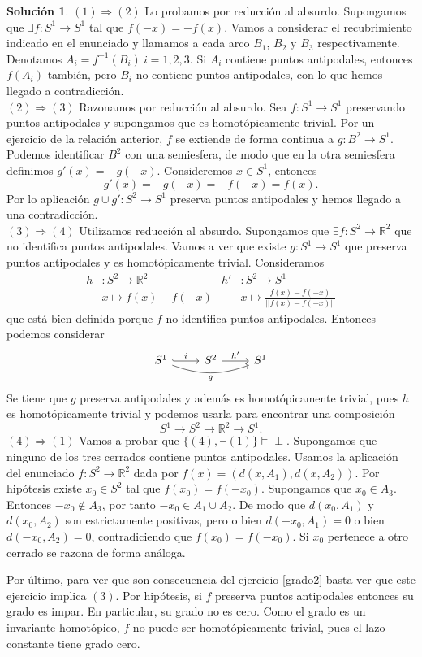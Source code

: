 \documentclass{article}
\theoremstyle{plain}
\theoremstyle{definition}
\newtheorem*{sol*}{Solución}
\newcommand{\R}{\mathbb{R}}
\begin{document}
\begin{sol*}
$\boxed{(1) \Rightarrow (2)}$ Lo probamos por reducción al absurdo. Supongamos que $\exists f:S^1\to S^1$ tal que $f(-x)=-f(x)$. Vamos a considerar el recubrimiento indicado en el enunciado y llamamos a cada arco $B_1$, $B_2$ y $B_3$ respectivamente. Denotamos $A_i=f^{-1}(B_i)\ i=1,2,3$. Si $A_i$ contiene puntos antipodales, entonces $f(A_i)$ también, pero $B_i$ no contiene puntos antipodales, con lo que hemos llegado a contradicción.\\
$\boxed{(2) \Rightarrow (3)}$ Razonamos por reducción al absurdo. Sea $f: S^1\to S^1$ preservando puntos antipodales y supongamos que es homotópicamente trivial. Por un ejercicio de la relación anterior, $f$ se extiende de forma continua a $g:B^2 \to S^1$. Podemos identificar $B^2$ con una semiesfera, de modo que en la otra semiesfera definimos $g'(x)=-g(-x)$. Consideremos $x\in S^1$, entonces
\[ g'(x)=-g(-x)=-f(-x)=f(x).\]
Por lo aplicación $g\cup g' :S^2\to S^1$ preserva puntos antipodales y hemos llegado a una contradicción.\\
$\boxed{(3) \Rightarrow (4)}$ Utilizamos reducción al absurdo. Supongamos que $\exists f:S^2\to\R^2$ que no identifica puntos antipodales. Vamos a ver que existe $g:S^1\to S^1$ que preserva puntos antipodales y es homotópicamente trivial. Consideramos 
\begin{align*}
h&:S^2\to\R^2 & h'&:S^2\longrightarrow S^1\\
 &x\longmapsto f(x)-f(-x) & &x\longmapsto\frac{f(x)-f(-x)}{||f(x)-f(-x)||}
\end{align*}
que está bien definida porque $f$ no identifica puntos antipodales. Entonces podemos considerar
\[
\begin{tikzcd}
S^1\arrow[r,"i",hookrightarrow]\arrow[rr,"g"', bend right=20]& S^2\arrow[r,"h'"]& S^1
\end{tikzcd}
\]
Se tiene que $g$ preserva antipodales y además es homotópicamente trivial, pues $h$ es homotópicamente trivial y podemos usarla para encontrar una composición $$S^1\to S^2\to\R^2\to S^1.$$
$\boxed{(4) \Rightarrow (1)}$ Vamos a probar que $\{(4),\neg (1)\}\models \perp$. Supongamos que ninguno de los tres cerrados contiene puntos antipodales. Usamos la aplicación del enunciado $f: S^2\to \mathbb{R}^2$ dada por $f(x) = (d(x,A_1), d(x,A_2))$. Por hipótesis existe $x_0\in S^2$ tal que $f(x_0)=f(-x_0)$. Supongamos que $x_0\in A_3$. Entonces $-x_0\notin A_3$, por tanto $-x_0\in A_1\cup A_2$. De modo que $d(x_0,A_1)$ y $d(x_0,A_2)$ son estrictamente positivas, pero o bien $d(-x_0,A_1)=0$ o bien $d(-x_0,A_2)=0$, contradiciendo que $f(x_0)=f(-x_0)$. Si $x_0$ pertenece a otro cerrado se razona de forma análoga.

Por último, para ver que son consecuencia del ejercicio \ref{grado2} basta ver que este ejercicio implica $(3)$. Por hipótesis, si $f$ preserva puntos antipodales entonces su grado es impar. En particular, su grado no es cero. Como el grado es un invariante homotópico, $f$ no puede ser homotópicamente trivial, pues el lazo constante tiene grado cero.
\end{sol*}
\end{document}
